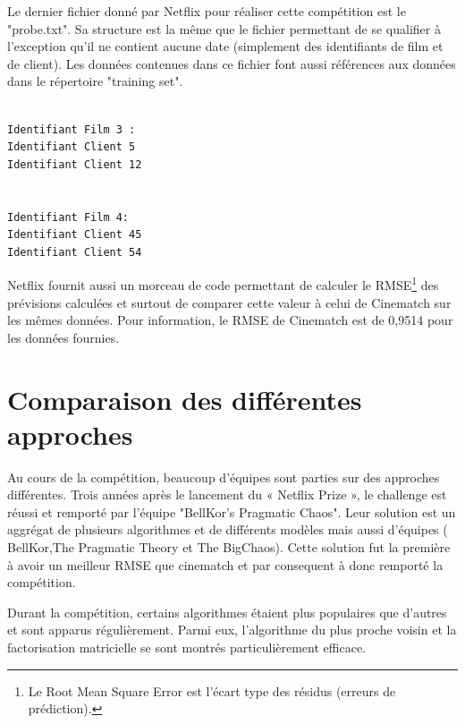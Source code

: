 \vspace{5mm} 

Le dernier fichier donné par Netflix pour réaliser cette compétition est le "probe.txt". Sa structure est la même que le fichier permettant de se qualifier à l'exception qu'il ne contient aucune date (simplement des identifiants de film et de client). Les données contenues dans ce fichier font aussi références aux données dans le répertoire "training set". 

\begin{verbatim}

Identifiant Film 3 :
Identifiant Client 5
Identifiant Client 12


Identifiant Film 4:
Identifiant Client 45
Identifiant Client 54
\end{verbatim}


Netflix fournit aussi un morceau de code permettant de calculer le RMSE\footnote{Le Root Mean Square Error est l'écart type des résidus (erreurs de prédiction).} des prévisions calculées et surtout de comparer cette valeur à celui de Cinematch sur les mêmes données. Pour information, le RMSE de Cinematch est de 0,9514 pour les données fournies. 


\vspace{5mm} 


\section{Comparaison des différentes approches}

Au cours de la compétition, beaucoup d'équipes sont parties sur des approches différentes. 
Trois années après le lancement du « Netflix Prize », le challenge est réussi et remporté par l’équipe "BellKor’s Pragmatic Chaos". Leur solution est un aggrégat de plusieurs algorithmes et de différents modèles mais aussi d'équipes ( BellKor\supercite{BellKor},The Pragmatic Theory\supercite{Pragmatic} et The BigChaos\supercite{BigChaos}). Cette solution fut la première à avoir un meilleur RMSE que cinematch et par consequent à donc remporté la compétition. 


\vspace{5mm}

Durant la compétition, certains algorithmes étaient plus populaires que d'autres et sont  apparus régulièrement. Parmi eux, l’algorithme du plus proche voisin et la factorisation matricielle se sont montrés particulièrement efficace\supercite{LessonsFromNetflixPrize}.

